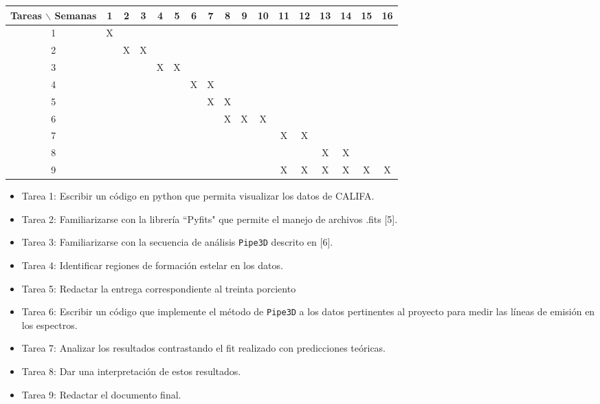 \documentclass[12pt]{article}
\begin{document}
\begin{table}[htb]
	\begin{tabular}{|c|cccccccccccccccc| }
	\hline
	Tareas $\backslash$ Semanas & 1 & 2 & 3 & 4 & 5 & 6 & 7 & 8 & 9 & 10 & 11 & 12 & 13 & 14 & 15 & 16  \\
	\hline
	1 & X &   &   &   &   &   &   &   &   &   &   &   &   &   &   &   \\
	2 &   & X & X &   &   &   &   &   &   &   &   &   &   &   &   &   \\
	3 &   &   &   & X & X &   &   &   &   &   &   &   &   &   &   &   \\
	4 &   &   &   &   &   & X & X &   &   &   &   &   &   &   &   &   \\
	5 &   &   &   &   &   &   & X & X &   &   &   &   &   &   &   &   \\
	6 &   &   &   &   &   &   &   & X & X & X &   &   &   &   &   &   \\
	7 &   &   &   &   &   &   &   &   &   &   & X & X &   &   &   &   \\
	8 &   &   &   &   &   &   &   &   &   &   &   &   & X & X &   &   \\
	9 &   &   &   &   &   &   &   &   &   &   & X & X & X & X & X & X \\
	\hline
	\end{tabular}
\end{table}
\vspace{1mm}

\begin{itemize}
    \item Tarea 1: Escribir un c\'odigo en python que permita visualizar los datos de CALIFA.
    \item Tarea 2: Familiarizarse con la librer\'ia ``Pyfits" que
      permite el manejo de archivos .fits [5].
    \item Tarea 3: Familiarizarse con la secuencia de an\'alisis \texttt{Pipe3D} descrito en [6].
    \item Tarea 4: Identificar regiones de formaci\'on estelar en
      los datos.
    \item Tarea 5: Redactar la entrega correspondiente al treinta porciento
    \item Tarea 6: Escribir un c\'odigo que implemente el m\'etodo de
      \texttt{Pipe3D} a los datos pertinentes al proyecto para medir las l\'ineas
      de emisi\'on en los espectros.
    \item Tarea 7: Analizar los resultados contrastando el fit
      realizado con predicciones te\'oricas.
    \item Tarea 8: Dar una interpretaci\'on de estos resultados.
    \item Tarea 9: Redactar el documento final.
\end{itemize}
\end{document}
